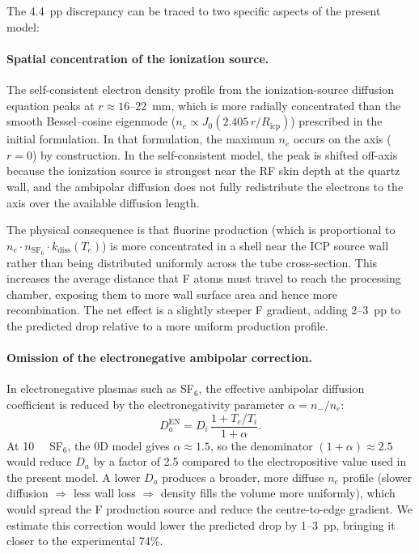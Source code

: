 \documentclass[11pt,a4paper]{report}
\newcommand{\SFsix}{\mathrm{SF}_6}
\newcommand{\Te}{T_e}
\begin{document}
The 4.4~pp discrepancy can be traced to two specific aspects of the present model:

\paragraph{Spatial concentration of the ionization source.}
The self-consistent electron density profile from the ionization-source diffusion equation peaks at $r \approx 16$--\SI{22}{\milli\meter}, which is more radially concentrated than the smooth Bessel--cosine eigenmode ($n_e \propto J_0(2.405\,r/R_\mathrm{icp})$) prescribed in the initial formulation.  In that formulation, the maximum $n_e$ occurs on the axis ($r = 0$) by construction.  In the self-consistent model, the peak is shifted off-axis because the ionization source is strongest near the RF skin depth at the quartz wall, and the ambipolar diffusion does not fully redistribute the electrons to the axis over the available diffusion length.

The physical consequence is that fluorine production (which is proportional to $n_e \cdot n_{\SFsix} \cdot k_\mathrm{diss}(\Te)$) is more concentrated in a shell near the ICP source wall rather than being distributed uniformly across the tube cross-section.  This increases the average distance that F atoms must travel to reach the processing chamber, exposing them to more wall surface area and hence more recombination.  The net effect is a slightly steeper F gradient, adding 2--3~pp to the predicted drop relative to a more uniform production profile.

\paragraph{Omission of the electronegative ambipolar correction.}
In electronegative plasmas such as SF$_6$, the effective ambipolar diffusion coefficient is reduced by the electronegativity parameter $\alpha = n_-/n_e$:
\begin{equation}
  D_a^\mathrm{EN} = D_i\,\frac{1 + \Te/T_i}{1 + \alpha}.
  \label{eq:Da-EN}
\end{equation}
At \SI{10}{\milli\torr} SF$_6$, the 0D model gives $\alpha \approx 1.5$, so the denominator $(1+\alpha) \approx 2.5$ would reduce $D_a$ by a factor of 2.5 compared to the electropositive value used in the present model.  A lower $D_a$ produces a broader, more diffuse $n_e$ profile (slower diffusion $\Rightarrow$ less wall loss $\Rightarrow$ density fills the volume more uniformly), which would spread the F production source and reduce the centre-to-edge gradient.  We estimate this correction would lower the predicted drop by 1--3~pp, bringing it closer to the experimental 74\%.
\end{document}
